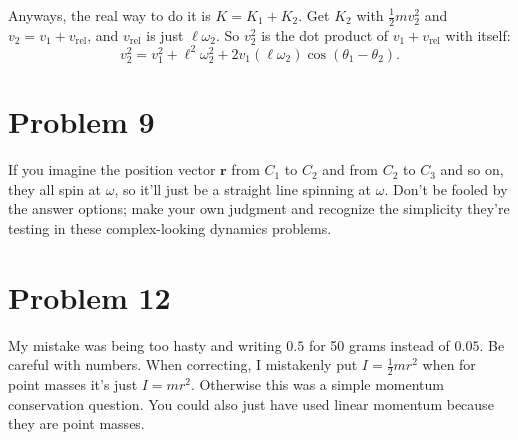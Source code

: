 \documentclass[11pt]{article}
\begin{document}
Anyways, the real way to do it is $K=K_1+K_2$. Get $K_2$ with $\tfrac12 mv_2^2$ and $v_2=v_1+v_{\mathrm{rel}}$, and $v_{\mathrm{rel}}$ is just $\ell\omega_2$.
So $v_2^2$ is the dot product of $v_1+v_{\mathrm{rel}}$ with itself:
\[
v_2^2=v_1^2+\ell^2\omega_2^2+2v_1(\ell\omega_2)\cos(\theta_1-\theta_2).
\]

\section*{Problem 9}
If you imagine the position vector $\mathbf{r}$ from $C_1$ to $C_2$ and from $C_2$ to $C_3$ and so on, they all spin at $\omega$, so it’ll just be a straight line spinning at $\omega$.
Don’t be fooled by the answer options; make your own judgment and recognize the simplicity they’re testing in these complex-looking dynamics problems.

\begin{center}
\end{center}

\section*{Problem 12}
My mistake was being too hasty and writing $0.5$ for 50 grams instead of $0.05$. Be careful with numbers.
When correcting, I mistakenly put $I=\tfrac12 mr^2$ when for point masses it’s just $I=mr^2$.
Otherwise this was a simple momentum conservation question.
You could also just have used linear momentum because they are point masses.
\end{document}
